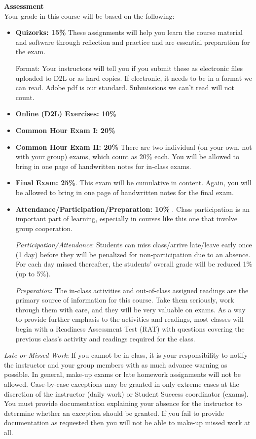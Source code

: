 {\bf Assessment}\\
Your grade in this course will be based on the following: 
\begin{itemize}
\item  {\bf Quizorks: 15\%}  These assignments  will help you learn
  the course material and software through 
  reflection and practice and are essential preparation for the exam. 

  Format: Your instructors will tell you if you submit these as
  electronic files uploaded to D2L or as hard copies. If electronic,
  it needs to be in a format we can read.  Adobe pdf is our standard.
  Submissions we can't read will not count.

\item {\bf Online (D2L) Exercises:  10\%}
\item {\bf Common Hour Exam I:  20\%}
\item {\bf Common Hour Exam II:  20\%} There are two individual (on your own, not with your group) exams, which count as 20\%  each. You will
  be allowed to bring in one page of handwritten notes for in-class exams.  
 
\item {\bf Final Exam:  25\%}.  This exam will be cumulative in
  content. Again, you will be allowed to bring in one page of
  handwritten notes for the final exam.   
 
\item {\bf Attendance/Participation/Preparation:  10\%} . Class
  participation is an important part of learning, especially in
  courses like this one that involve group cooperation.    

  {\it Participation/Attendance}: Students can miss class/arrive
  late/leave early once (1 day) before they will be penalized for
  non-participation due to an absence.  For each day missed
  thereafter, the students’ overall grade will be reduced 1\% (up to
  5\%).   

  {\it Preparation}: The in-class activities and out-of-class assigned
  readings are the primary source of  information for this course.
  Take them seriously, work through them with care, and they will be
  very valuable on exams.  As a way to provide further emphasis to the
  activities and readings, most classes will begin with a Readiness
  Assessment Test (RAT) with questions covering the previous class's
  activity and readings required for the class.   
\end{itemize}

{\it Late or Missed Work}:  If you cannot be in class, it is your 
responsibility to notify the instructor and your group members with as
much advance warning as possible. In general, make-up exams or late
homework assignments will not be allowed. Case-by-case exceptions may
be granted in only extreme cases at the discretion of the
instructor (daily work) or Student Success coordinator (exams). You
must provide documentation explaining your absence for 
the instructor to determine whether an exception should be granted. If
you fail to provide documentation as requested then you will not be
able to make-up missed work at all.   
 
